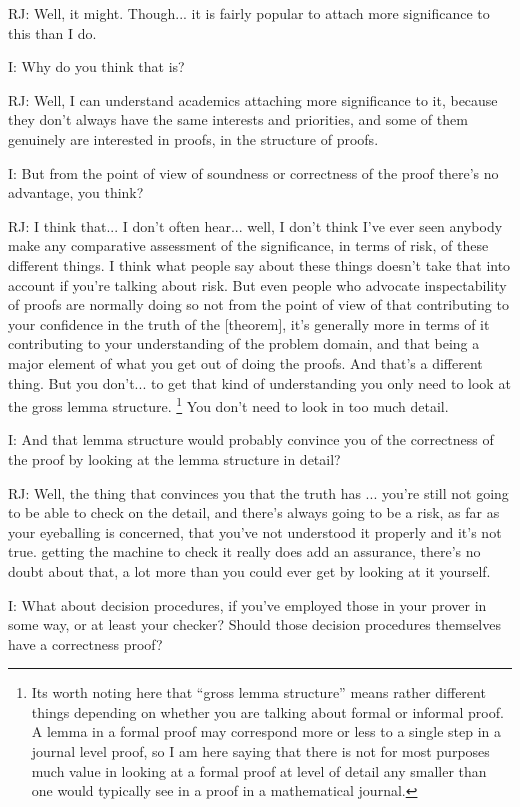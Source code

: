 \documentclass[10pt,titlepage]{book}
\begin{document}
RJ: Well, it might.
Though... it is fairly popular to attach more significance to this than I do.

I: Why do you think that is?

RJ: Well, I can understand academics attaching more significance to it, because they don't always have the same interests and priorities, and some of them genuinely are interested in proofs, in the structure of proofs.

I: But from the point of view of soundness or correctness of the proof there's no advantage, you think?

RJ: I think that... I don't often hear... well, I don't think I've ever seen anybody make any comparative assessment of the significance, in terms of risk, of these different things.
I think what people say about these things doesn't take that into account if you're talking about risk.
But even people who advocate inspectability of proofs are normally doing so not from the point of view of that contributing to your confidence in the truth of the [theorem], it's generally more in terms of it contributing to your understanding of the problem domain, and that being a major element of what you get out of doing the proofs.
And that's a different thing.
But you don't... to get that kind of understanding you only need to look at the gross lemma structure.%
\footnote{
Its worth noting here that ``gross lemma structure'' means rather different things depending on whether you are talking about formal or informal proof.
A lemma in a formal proof may correspond more or less to a single step in a journal level proof, so I am here saying that there is not for most purposes much value in looking at a formal proof at level of detail any smaller than one would typically see in a proof in a mathematical journal.
}%
You don't need to look in too much detail.

I: And that lemma structure would probably convince you of the correctness of the proof by looking at the lemma structure in detail?

RJ: Well, the thing that convinces you that the truth has		...  you're still not going to be able to check on the detail, and there's always going to be a risk, as far as your eyeballing is concerned, that you've not understood it properly and it's not true.  getting the machine to check it really does add an assurance, there's no doubt about that, a lot more than you could ever get by looking at it yourself.

I: What about decision procedures, if you've employed those in your prover in some way, or at least your checker?
Should those decision procedures themselves have a correctness proof?
\end{document}
